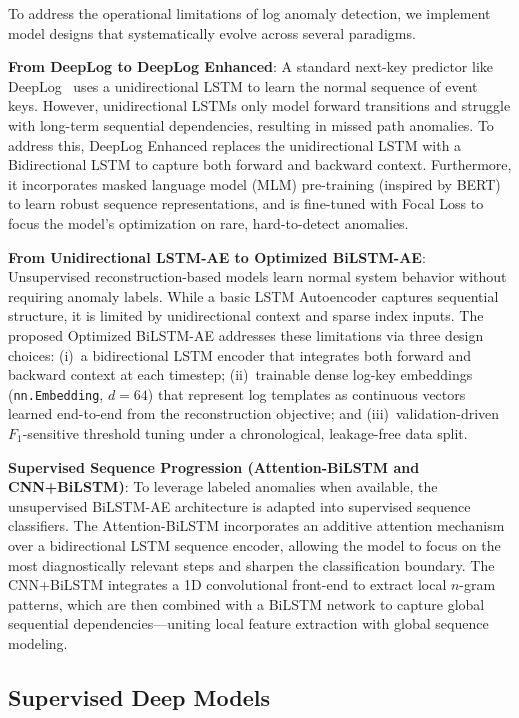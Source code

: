 \documentclass{elektr}
\begin{document}
To address the operational limitations of log anomaly detection, we implement
model designs that systematically evolve across several paradigms.

\textbf{From DeepLog to DeepLog Enhanced}:
A standard next-key predictor like DeepLog~\cite{ref5} uses a unidirectional
LSTM to learn the normal sequence of event keys. However, unidirectional LSTMs
only model forward transitions and struggle with long-term sequential
dependencies, resulting in missed path anomalies. To address this, DeepLog
Enhanced replaces the unidirectional LSTM with a Bidirectional LSTM to capture
both forward and backward context. Furthermore, it incorporates masked language
model (MLM) pre-training (inspired by BERT) to learn robust sequence
representations, and is fine-tuned with Focal Loss to focus the model's
optimization on rare, hard-to-detect anomalies.

\textbf{From Unidirectional LSTM-AE to Optimized BiLSTM-AE}:
Unsupervised reconstruction-based models learn normal system behavior without
requiring anomaly labels. While a basic LSTM Autoencoder captures sequential
structure, it is limited by unidirectional context and sparse index inputs.
The proposed Optimized BiLSTM-AE addresses these limitations via three
design choices: (i)~a bidirectional LSTM encoder that integrates both forward
and backward context at each timestep; (ii)~trainable dense log-key embeddings
(\texttt{nn.Embedding}, $d{=}64$) that represent log templates as continuous
vectors learned end-to-end from the reconstruction objective; and
(iii)~validation-driven $F_1$-sensitive threshold tuning under a chronological,
leakage-free data split.

\textbf{Supervised Sequence Progression (Attention-BiLSTM and CNN+BiLSTM)}:
To leverage labeled anomalies when available, the unsupervised BiLSTM-AE
architecture is adapted into supervised sequence classifiers. The
Attention-BiLSTM incorporates an additive attention mechanism over a
bidirectional LSTM sequence encoder, allowing the model to focus on the most
diagnostically relevant steps and sharpen the classification boundary. The
CNN+BiLSTM integrates a 1D convolutional front-end to extract local $n$-gram
patterns, which are then combined with a BiLSTM network to
capture global sequential dependencies---uniting local feature extraction with
global sequence modeling.

\subsection{Supervised Deep Models}
\end{document}
